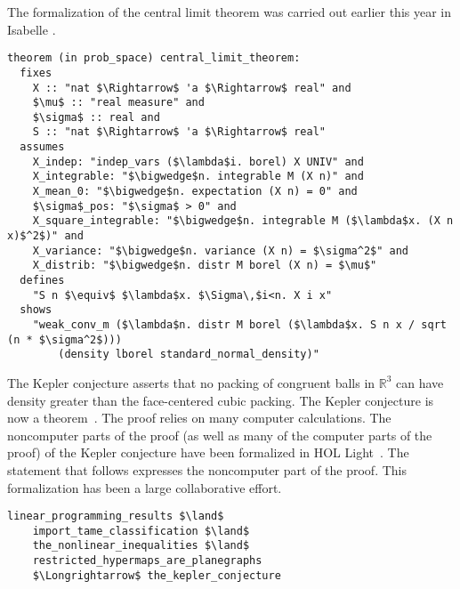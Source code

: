 \documentclass[brochure,english,12pt]{bourbaki}
\theoremstyle{plain}
\def\ring#1{{\mathbb{#1}}}
\begin{document}
The formalization of the central limit theorem was carried out earlier this year in Isabelle \cite{avigad2014formally}.

\begin{lstlisting}[keepspaces=true,stringstyle=\tt,basicstyle=\small,frame=single,framesep=8pt,mathescape,morekeywords={theorem,fixes,assumes,defines,shows,Variable,Theorem,Proof,Qed},columns=flexible]
theorem (in prob_space) central_limit_theorem:
  fixes 
    X :: "nat $\Rightarrow$ 'a $\Rightarrow$ real" and
    $\mu$ :: "real measure" and
    $\sigma$ :: real and
    S :: "nat $\Rightarrow$ 'a $\Rightarrow$ real"
  assumes
    X_indep: "indep_vars ($\lambda$i. borel) X UNIV" and
    X_integrable: "$\bigwedge$n. integrable M (X n)" and
    X_mean_0: "$\bigwedge$n. expectation (X n) = 0" and
    $\sigma$_pos: "$\sigma$ > 0" and
    X_square_integrable: "$\bigwedge$n. integrable M ($\lambda$x. (X n x)$^2$)" and
    X_variance: "$\bigwedge$n. variance (X n) = $\sigma^2$" and
    X_distrib: "$\bigwedge$n. distr M borel (X n) = $\mu$"
  defines
    "S n $\equiv$ $\lambda$x. $\Sigma\,$i<n. X i x"
  shows
    "weak_conv_m ($\lambda$n. distr M borel ($\lambda$x. S n x / sqrt (n * $\sigma^2$))) 
        (density lborel standard_normal_density)"
\end{lstlisting}



The Kepler conjecture asserts that no packing of congruent balls in $\ring{R}^3$ can have density greater than
the face-centered cubic packing.  The Kepler conjecture is now a theorem~\cite{Hales:2006:DCG}.  
The proof relies on many computer
calculations.  The noncomputer parts of the proof (as well as many of the computer parts of the proof) of the Kepler conjecture 
have been formalized in HOL Light~\cite{website:FlyspeckProject}.  
The statement that follows expresses the noncomputer part of the proof.
This formalization has been a large collaborative effort.

\begin{lstlisting}[keepspaces=true,stringstyle=\tt,basicstyle=\small,frame=single,framesep=8pt,framextopmargin=10pt,mathescape,morekeywords={Variable,Theorem,Proof,Qed},columns=flexible]
    linear_programming_results $\land$      
    import_tame_classification $\land$      
    the_nonlinear_inequalities $\land$
    restricted_hypermaps_are_planegraphs    
    $\Longrightarrow$ the_kepler_conjecture
\end{lstlisting}
\end{document}
